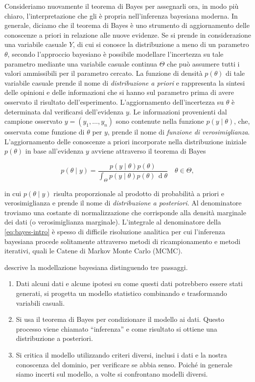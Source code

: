 \documentclass[
  11pt,
]{krantz}
\providecommand{\tightlist}{%
  \setlength{\itemsep}{0pt}\setlength{\parskip}{0pt}}
\theoremstyle{definition}
\theoremstyle{definition}
\theoremstyle{definition}
\theoremstyle{definition}
\theoremstyle{remark}
\begin{document}
Consideriamo nuovamente il teorema di Bayes per assegnarli ora, in modo più chiaro, l'interpretazione che gli è propria nell'inferenza bayesiana moderna. In generale, diciamo che il teorema di Bayes è uno strumento di aggiornamento delle conoscenze a priori in relazione alle nuove evidenze. Se si prende in considerazione una variabile casuale \(Y\), di cui si conosce la distribuzione a meno di un parametro \(\theta\), secondo l'approccio bayesiano è possibile modellare l'incertezza su tale parametro mediante una variabile casuale continua \(\Theta\) che può assumere tutti i valori ammissibili per il parametro cercato. La funzione di densità \(p(\theta)\) di tale variabile casuale prende il nome di \emph{distribuzione a priori} e rappresenta la sintesi delle opinioni e delle informazioni che si hanno sul parametro prima di avere osservato il risultato dell'esperimento. L'aggiornamento dell'incertezza su \(\theta\) è determinata dal verificarsi dell'evidenza \(y\). Le informazioni provenienti dal campione osservato \(y = (y_1, \dots, y_n)\) sono contenute nella funzione \(p(y \mid \theta)\), che, osservata come funzione di \(\theta\) per \(y\), prende il nome di \emph{funzione di verosimiglianza}. L'aggiornamento delle conoscenze a priori incorporate nella distribuzione iniziale \(p(\theta)\) in base all'evidenza \(y\) avviene attraverso il teorema di Bayes

\begin{equation}
p(\theta \mid y) = \frac{p(y \mid \theta) p(\theta)}{\int_{\Theta}p(y \mid \theta) p(\theta) \,\operatorname {d}\!\theta} \quad \theta \in \Theta,
 \label{eq:bayes-intro}
\end{equation}

in cui \(p(\theta \mid y)\) risulta proporzionale al prodotto di probabilità a priori e verosimiglianza e prende il nome di \emph{distribuzione a posteriori}. Al denominatore troviamo una costante di normalizzazione che corrisponde alla densità marginale dei dati (o verosimiglianza marginale). L'integrale al denominatore della \eqref{eq:bayes-intro} è spesso di difficile risoluzione analitica per cui l'inferenza bayesiana procede solitamente attraverso metodi di ricampionamento e metodi iterativi, quali le Catene di Markov Monte Carlo (MCMC).

\citet{martin2022bayesian} descrive la modellazione bayesiana distinguendo tre passaggi.

\begin{enumerate}
\def\labelenumi{\arabic{enumi}.}
\tightlist
\item
  Dati alcuni dati e alcune ipotesi su come questi dati potrebbero essere stati generati, si progetta un modello statistico combinando e trasformando variabili casuali.
\item
  Si usa il teorema di Bayes per condizionare il modello ai dati. Questo processo viene chiamato ``inferenza'' e come risultato si ottiene una distribuzione a posteriori.
\item
  Si critica il modello utilizzando criteri diversi, inclusi i dati e la nostra conoscenza del dominio, per verificare se abbia senso. Poiché in generale siamo incerti sul modello, a volte si confrontano modelli diversi.
\end{enumerate}
\end{document}
